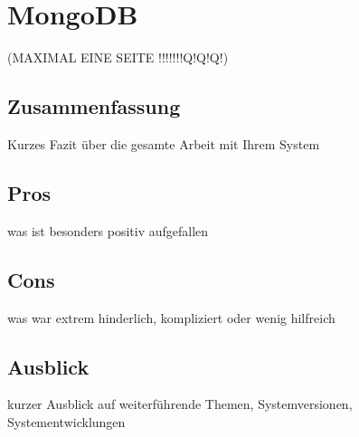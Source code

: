 \section{MongoDB}
(MAXIMAL EINE SEITE !!!!!!!Q!Q!Q!)
\subsection{Zusammenfassung}
Kurzes Fazit über die gesamte Arbeit mit Ihrem System
\subsection{Pros}
was ist besonders positiv aufgefallen
\subsection{Cons}
was war extrem hinderlich, kompliziert oder wenig hilfreich
\subsection{Ausblick}
kurzer Ausblick auf weiterführende Themen, Systemversionen, Systementwicklungen